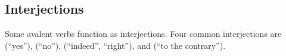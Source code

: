 \subsection{Interjections} \label{sec:interjections}

Some avalent verbs function as interjections. Four common interjections are
 (``yes''),  (``no''),  (``indeed'',
``right''), and  (``to the contrary'').
